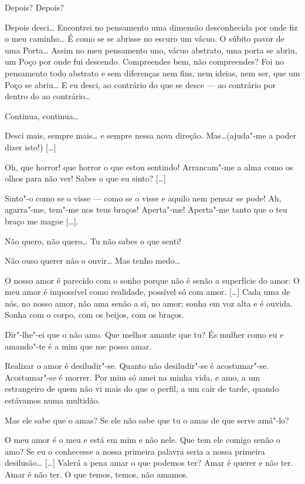   Depois? Depois?

 Depois desci\ldots{} Encontrei no pensamento uma dimensão desconhecida
por onde fiz o meu caminho\ldots{} É como se se abrisse no escuro um vácuo.
O súbito pavor de uma Porta\ldots{} Assim no meu pensamento uno, vácuo
abstrato, uma porta se abriu, um Poço por onde fui descendo.
Compreendes bem, não compreendes? Foi no pensamento todo abstrato e
sem diferenças nem fins, nem ideias, nem ser, que um Poço se abriu\ldots{} E
eu desci, ao contrário do que se desce --- ao contrário por dentro do
ao contrário\ldots{}

\hfill{}

 Continua, continua\ldots{}

 Desci mais, sempre mais\ldots{} e sempre nessa nova direção.
Mas\ldots{}(ajuda"-me a poder dizer isto!) [\ldots{}]

 Oh, que horror! que horror o que estou sentindo! Arrancam"-me a alma
como os olhos para não ver! Sabes o que eu sinto? [\ldots{}]

Sinto"-o como se o visse --- como se o visse e aquilo nem pensar se pode!
Ah, agarra"-me, tem"-me nos teus braços! Aperta"-me! Aperta"-me tanto que
o teu braço me magoe [\ldots{}].

 Não quero, não quero\ldots{} Tu não sabes o que senti!

 Não ouso querer não o ouvir\ldots{} Mas tenho medo\ldots{}

 O nosso amor é parecido com o sonho porque não é senão a
superfície do amor: O meu amor é impossível como realidade, possível
só com amor. [\ldots{}] Cada uma de nós, no nosso amor, não ama senão a si,
no amor; sonha em voz alta e é ouvida. Sonha com o corpo, com os
beijos, com os braços.

 Dir"-lhe"-ei que o não amo. Que melhor amante que tu? És mulher como
eu e amando"-te é a mim que me posso amar.

 Realizar o amor é desiludir"-se. Quanto não desiludir"-se é
acostumar"-se. Acostumar"-se é morrer. Por mim só amei na minha vida, e
amo, a um estrangeiro de quem não vi mais do que o perfil, a um cair
de tarde, quando estávamos numa multidão.

 Mas ele sabe que o amas? Se ele não sabe que tu o amas de que
serve amá"-lo? 

 O meu amor é o meu e está em mim e não nele. Que tem ele comigo
senão o amo? Se eu o conhecesse a nossa primeira palavra seria a
nossa primeira desilusão\ldots{} [\ldots{}] Valerá a pena amar o que podemos
ter? Amar é querer e não ter. Amar é não ter. O que temos, temos, não
amamos.


